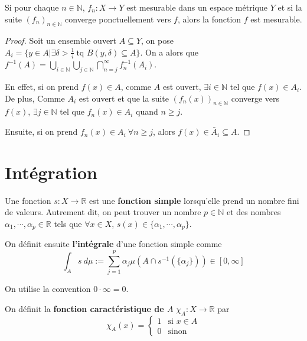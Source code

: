 \begin{theo}
    Si pour chaque $n\in\mathbb{N}$, $f_n:X\to Y$ est mesurable dans un espace métrique $Y$ et si la suite $(f_n)_{n\in\mathbb{N}}$ converge ponctuellement vers $f$, alors la fonction $f$ est mesurable.
\end{theo}
\begin{proof}
    Soit un ensemble ouvert $A\subseteq Y$, on pose $A_i=\{y\in A\big|\exists \delta>\frac{1}{i} \ \text{tq } B(y,\delta)\subseteq A\}$. On a alors que $f^{-1}(A)=\bigcup_{i\in\mathbb{N}}\bigcup_{j\in\mathbb{N}}\bigcap_{n=j}^\infty f_n^{-1}(A_i)$.
    
    En effet, si on prend $f(x)\in A$, comme $A$ est ouvert, $\exists i\in\mathbb{N}$ tel que $f(x)\in A_i$. De plus, Comme $A_i$ est ouvert et que la suite $(f_n(x))_{n\in\mathbb{N}}$ converge vers $f(x)$, $\exists j\in\mathbb{N}$ tel que $f_n(x)\in A_i$ quand $n\geq j$. 
    
    Ensuite, si on prend $f_n(x)\in A_i \ \forall n\geq j$, alors $f(x)\in\bar{A}_i\subseteq A$.
\end{proof}


\section{Intégration}
\begin{definition}
    Une fonction $s:X\to\mathbb{R}$ est une \textbf{fonction simple} lorsqu'elle prend un nombre fini de valeurs. Autrement dit, on peut trouver un nombre $p\in\mathbb{N}$ et des nombres $\alpha_1,\cdots,\alpha_p\in\mathbb{R}$ tels que $\forall x\in X$, $s(x)\in\{\alpha_1,\cdots,\alpha_p\}$.
    
    On définit ensuite \textbf{l'intégrale} d'une fonction simple comme
    \begin{equation*}
        \int_A s\ d\mu := \sum_{j=1}^p\alpha_j\mu\left(A\cap s^{-1}(\{\alpha_j\})\right)\in[0,\infty]
    \end{equation*}
    
    On utilise la convention $0\cdot\infty=0$. 
\end{definition}

\begin{definition}
    On définit la \textbf{fonction caractéristique de $A$} $\chi_A:X\to\mathbb{R}$ par
    \begin{equation*}
        \chi_A(x) = \left\{\begin{array}{ll}
            1 & \text{si $x\in A$} \\
            0 & \text{sinon}
        \end{array}\right.
    \end{equation*}
\end{definition}

